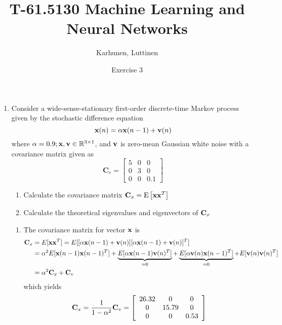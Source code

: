 
\title{T-61.5130 Machine Learning and Neural Networks}
\author{Karhunen, Luttinen}
\date{Exercise 3}





\maketitle
\thispagestyle{empty}

\begin{enumerate}
  
\item Consider a wide-sense-stationary
  first-order discrete-time Markov process given by the stochastic
  difference equation
  \[
  {\bf x}(n) = \alpha {\bf x}(n-1) + {\bf v}(n)
  \]
  where $\alpha = 0.9; {\bf x}, {\bf v} \in \mathbb{R}^{3\times 1}$,
  and ${\bf v}$ is zero-mean Gaussian white noise with a covariance
  matrix given as
  \[ \textbf{C}_v = \left[ \begin{array}{ccc}
      5 & 0 & 0 \\
      0 & 3 & 0 \\
      0 & 0 & 0.1 \end{array} \right]\]

  \begin{enumerate}
  \item Calculate the covariance matrix ${\bf C}_x = \text{E}\left[
      {\bf xx}^T \right]$
  \item Calculate the theoretical eigenvalues and eigenvectors of
    ${\bf C}_x$
  \end{enumerate}
  
  \begin{solution}

    \begin{enumerate}
    \item 
      The covariance matrix for vector $\mathbf{x}$ is
      \[
      \begin{split}
        \mathbf{C}_x &= E[\mathbf{x} \mathbf{x}^T] =
        E[[\alpha\mathbf{x}(n-1)+\mathbf{v}(n)]
        [\alpha\mathbf{x}(n-1)+\mathbf{v}(n)]^T]
        \\
        &=\alpha^2 E[\mathbf{x}(n-1)\mathbf{x}(n-1)^T]+
        \underbrace{E[\alpha \mathbf{x}(n-1)\mathbf{v}(n)^T]}_{=0}+
        \underbrace{E[\alpha \mathbf{v}(n)\mathbf{x}(n-1)^T]}_{=0}+
        E[\mathbf{v}(n)\mathbf{v}(n)^T]
        \\
        &=\alpha^2 \mathbf{C}_x + \mathbf{C}_v
      \end{split}
      \]
      which yields
      \[
      \mathbf{C}_x = \frac{1}{1-\alpha^2}\mathbf{C}_v=
      \left[\begin{array}{ccc}
          26.32 & 0     & 0 \\
          0     & 15.79 & 0 \\
          0     & 0     & 0.53 
        \end{array}\right]
      \]


\end{enumerate}
\end{solution}
\end{enumerate}
